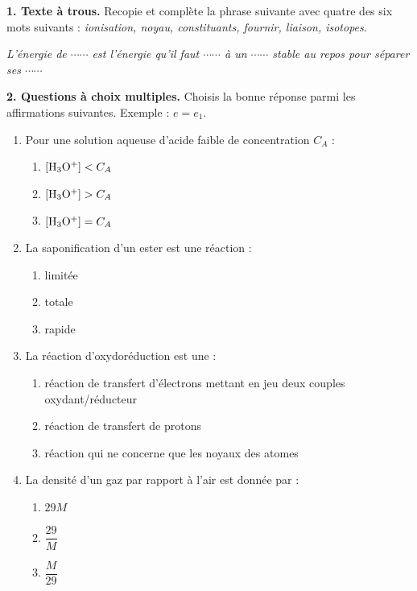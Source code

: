 \documentclass[11pt]{article}
\begin{document}



\noindent\textbf{1. Texte à trous.} Recopie et complète la phrase suivante avec quatre des six mots suivants : \textit{ionisation, noyau, constituants, fournir, liaison, isotopes}.

\textit{L'énergie de $\cdots\cdots$ est l'énergie qu'il faut $\cdots\cdots$ à un $\cdots\cdots$ stable au repos pour séparer ses $\cdots\cdots$}

\medskip
\noindent\textbf{2. Questions à choix multiples.} Choisis la bonne réponse parmi les affirmations suivantes. Exemple : $e = e_1$.
\begin{enumerate}[label=\alph*.]
  \item Pour une solution aqueuse d'acide faible de concentration $C_A$ :
  \begin{enumerate}[label=a.\arabic*.]
    \item $[\mathrm{H_3O^+}] < C_A$
    \item $[\mathrm{H_3O^+}] > C_A$
    \item $[\mathrm{H_3O^+}] = C_A$
  \end{enumerate}
  \item La saponification d'un ester est une réaction :
  \begin{enumerate}[label=b.\arabic*.]
    \item limitée
    \item totale
    \item rapide
  \end{enumerate}
  \item La réaction d'oxydoréduction est une :
  \begin{enumerate}[label=c.\arabic*.]
    \item réaction de transfert d'électrons mettant en jeu deux couples oxydant/réducteur
    \item réaction de transfert de protons
    \item réaction qui ne concerne que les noyaux des atomes
  \end{enumerate}
  \item La densité d'un gaz par rapport à l'air est donnée par :
  \begin{enumerate}[label=d.\arabic*.]
    \item $29M$
    \item $\dfrac{29}{M}$
    \item $\dfrac{M}{29}$
  \end{enumerate}
\end{enumerate}
\end{document}
